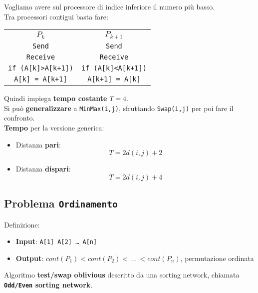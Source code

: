 Vogliamo avere sul processore di indice inferiore il numero più basso.\\

Tra processori contigui basta fare:
\begin{center}
	\begin{tabular}{c c}
		$P_k$ & $P_{k+1}$ \\
		\texttt{Send} & \texttt{Send} \\
		\texttt{Receive} & \texttt{Receive} \\
		\texttt{if (A[k]>A[k+1])} & \texttt{if (A[k]<A[k+1])} \\
		\texttt{A[k] = A[k+1]} & \texttt{A[k+1] = A[k]}
	\end{tabular}
\end{center}

Quindi impiega \textbf{tempo costante} $T = 4$.\\

Si può \textbf{generalizzare} a \texttt{MinMax(i,j)}, sfruttando \texttt{Swap(i,j)} per poi fare il confronto.\\

\textbf{Tempo} per la versione generica: 
\begin{itemize}
	\item Distanza \textbf{pari}: 
	$$ T = 2 d(i,j) + 2 $$
	\item Distanza \textbf{dispari}:
	$$ T = 2 d(i,j) + 4 $$
\end{itemize}


\newpage

\subsection{Problema \texttt{Ordinamento}}

Definizione:
\begin{itemize}
	\item \textbf{Input}: \texttt{A[1]  A[2] \dots  \; A[n]}
	\item \textbf{Output}: $cont(P_1) < cont(P_2) < \, \dots \, < cont(P_n)$, permutazione ordinata
\end{itemize} 

Algoritmo \textbf{test/swap oblivious} descritto da una sorting network, chiamata \textbf{\texttt{Odd/Even} sorting network}.\\

